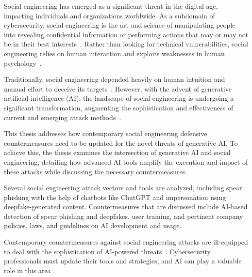 %
%
Social engineering has emerged as a significant threat in the digital age, impacting individuals and organizations worldwide. As a subdomain of cybersecurity, social engineering is the art and science of manipulating people into revealing confidential information or performing actions that may or may not be in their best interests~\citep {hadnagySocialEngineering2018}. Rather than looking for technical vulnerabilities, social engineering relies on human interaction and exploits weaknesses in human psychology~\citep{wang_Defining_Social_Engineering_2020}.





%
%
Traditionally, social engineering depended heavily on human intuition and manual effort to deceive its targets~\citep{mitnick_The_Art_of_Deception_2003}. However, with the advent of generative artificial intelligence (AI), the landscape of social engineering is undergoing a  significant transformation, augmenting the sophistication and effectiveness of current and emerging attack methods~\citep{fakhouriAIDrivenSolutionsForSocialEngineeringAttacks2024}.





%
%
This thesis addresses how contemporary social engineering defensive countermeasures need to be updated for the novel threats of generative AI. To achieve this, the thesis examines the intersection of generative AI and social engineering, detailing how advanced AI tools amplify the execution and impact of these attacks while discussing the necessary countermeasures.





%
%
Several social engineering attack vectors and tools are analyzed, including spear phishing with the help of chatbots like ChatGPT and impersonation using deepfake-generated content. Countermeasures that are discussed include AI-based detection of spear phishing and deepfakes, user training, and pertinent company policies, laws, and guidelines on AI development and usage.





%
%
Contemporary countermeasures against social engineering attacks are ill-equipped to deal with the sophistication of AI-powered threats~\citep{fakhouriAIDrivenSolutionsForSocialEngineeringAttacks2024, blauth_AI_Crime_Overview_Malicious_Use_Abuse_2022}. Cybersecurity professionals must update their tools and strategies, and AI can play a valuable role in this area \citep{tsinganosTowardsAnAutomatedRecognitionSystem2018}.






